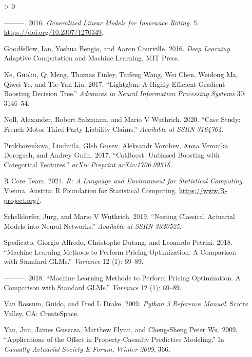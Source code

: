 \documentclass[
]{article}
\newlength{\cslhangindent}
\newenvironment{CSLReferences}[2] %
 {%
  \setlength{\parindent}{0pt}
  \ifodd #1 \everypar{\setlength{\hangindent}{\cslhangindent}}\ignorespaces\fi
  \ifnum #2 > 0
  \setlength{\parskip}{#2\baselineskip}
  \fi
 }%
 {}
\begin{document}
\begin{CSLReferences}{1}{0}
\leavevmode\hypertarget{ref-goldburd2016generalized}{}%
---------. 2016. \emph{{Generalized Linear Models for Insurance
Rating}}. 5. \url{https://doi.org/10.2307/1270349}.

\leavevmode\hypertarget{ref-Goodfellow-et-al-2016}{}%
Goodfellow, Ian, Yoshua Bengio, and Aaron Courville. 2016. \emph{{Deep
Learning}}. Adaptive Computation and Machine Learning. MIT Press.

\leavevmode\hypertarget{ref-ke2017lightgbm}{}%
Ke, Guolin, Qi Meng, Thomas Finley, Taifeng Wang, Wei Chen, Weidong Ma,
Qiwei Ye, and Tie-Yan Liu. 2017. {``Lightgbm: A Highly Efficient
Gradient Boosting Decision Tree.''} \emph{Advances in Neural Information
Processing Systems} 30: 3146--54.

\leavevmode\hypertarget{ref-noll2020case}{}%
Noll, Alexander, Robert Salzmann, and Mario V Wuthrich. 2020. {``Case
Study: French Motor Third-Party Liability Claims.''} \emph{Available at
SSRN 3164764}.

\leavevmode\hypertarget{ref-prokhorenkova2017catboost}{}%
Prokhorenkova, Liudmila, Gleb Gusev, Aleksandr Vorobev, Anna Veronika
Dorogush, and Andrey Gulin. 2017. {``CatBoost: Unbiased Boosting with
Categorical Features.''} \emph{arXiv Preprint arXiv:1706.09516}.

\leavevmode\hypertarget{ref-RSoftware}{}%
R Core Team. 2021. \emph{R: A Language and Environment for Statistical
Computing}. Vienna, Austria: R Foundation for Statistical Computing.
\url{https://www.R-project.org/}.

\leavevmode\hypertarget{ref-schelldorfer2019nesting}{}%
Schelldorfer, Jürg, and Mario V Wuthrich. 2019. {``Nesting Classical
Actuarial Models into Neural Networks.''} \emph{Available at SSRN
3320525}.

\leavevmode\hypertarget{ref-spedicato2018machine}{}%
Spedicato, Giorgio Alfredo, Christophe Dutang, and Leonardo Petrini.
2018. {``Machine Learning Methods to Perform Pricing Optimization. A
Comparison with Standard GLMs.''} \emph{Variance} 12 (1): 69--89.

\leavevmode\hypertarget{ref-spedicato2018machine}{}%
---------. 2018. {``Machine Learning Methods to Perform Pricing
Optimization. A Comparison with Standard GLMs.''} \emph{Variance} 12
(1): 69--89.

\leavevmode\hypertarget{ref-python3}{}%
Van Rossum, Guido, and Fred L Drake. 2009. \emph{{Python 3 Reference
Manual}}. Scotts Valley, CA: CreateSpace.

\leavevmode\hypertarget{ref-yan_applications_2009}{}%
Yan, Jun, James Guszcza, Matthew Flynn, and Cheng-Sheng Peter Wu. 2009.
{``Applications of the Offset in Property-Casualty Predictive
Modeling.''} In \emph{Casualty {Actuarial} {Society} {E}-{Forum},
{Winter} 2009}, 366.

\end{CSLReferences}
\end{document}
